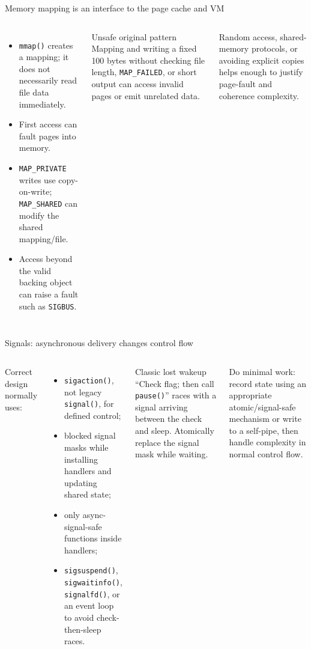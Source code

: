 \documentclass[aspectratio=169,11pt]{beamer}
\newcommand{\code}[1]{\texttt{#1}}
\begin{document}
\begin{frame}{Memory mapping is an interface to the page cache and VM}
  \begin{columns}[T,onlytextwidth]
      \begin{itemize}
        \item \code{mmap()} creates a mapping; it does not necessarily read file data immediately.
        \item First access can fault pages into memory.
        \item \code{MAP\_PRIVATE} writes use copy-on-write; \code{MAP\_SHARED} can modify the shared mapping/file.
        \item Access beyond the valid backing object can raise a fault such as \code{SIGBUS}.
      \end{itemize}
      \begin{alertblock}{Unsafe original pattern}
        Mapping and writing a fixed 100 bytes without checking file length, \code{MAP\_FAILED}, or short output can access invalid pages or emit unrelated data.
      \end{alertblock}
      \begin{tcolorbox}[title=Use when]
        Random access, shared-memory protocols, or avoiding explicit copies helps enough to justify page-fault and coherence complexity.
      \end{tcolorbox}
  \end{columns}
\end{frame}

\begin{frame}{Signals: asynchronous delivery changes control flow}
  \begin{columns}[T,onlytextwidth]
      Correct design normally uses:
      \begin{itemize}
        \item \code{sigaction()}, not legacy \code{signal()}, for defined control;
        \item blocked signal masks while installing handlers and updating shared state;
        \item only async-signal-safe functions inside handlers;
        \item \code{sigsuspend()}, \code{sigwaitinfo()}, \code{signalfd()}, or an event loop to avoid check-then-sleep races.
      \end{itemize}
      \begin{alertblock}{Classic lost wakeup}
        ``Check flag; then call \code{pause()}'' races with a signal arriving between the check and sleep. Atomically replace the signal mask while waiting.
      \end{alertblock}
      \begin{tcolorbox}[title=Handler rule]
        Do minimal work: record state using an appropriate atomic/signal-safe mechanism or write to a self-pipe, then handle complexity in normal control flow.
      \end{tcolorbox}
  \end{columns}
\end{frame}
\end{document}
